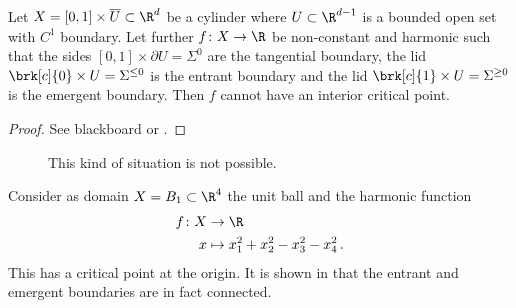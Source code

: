 \begin{frame}
  \begin{proposition}\label{pr:n3_inflowOutflowCylinder}
    Let $X=[0,1]\times \overline{U}\subset\R^d$ be a cylinder where $U\subset\R^{d-1}$ is a bounded open set with $C^1$ boundary.
    Let further $f\colon X\to\R$ be non-constant and
    harmonic such that the sides
    $[0,1]\times \partial U=\Sigma^0$ are the tangential boundary,
    the lid $\brk[c]{0}\times U=\Sigma^{\leq0}$ is the entrant boundary and
    the lid $\brk[c]{1}\times U=\Sigma^{\geq0}$ is the emergent boundary. 
    Then $f$ cannot have an interior critical point.
  \end{proposition}
  \begin{proof}
    See blackboard or \cite{Koppenhoefer2024}.
  \end{proof}
  
\end{frame}

\begin{frame}
  \begin{figure}
    \centering
    
    \caption{This kind of situation is not possible.}
    \label{fi:n3_cylinder}
  \end{figure}
\end{frame}

\begin{frame}
  \begin{example}[Connected entrant boundary in $d=4$ dimensions]\label{ex:n4}
    Consider as domain $X=B_1\subset\R^4$ the unit ball and
    the harmonic function 
    \begin{equation*}
      \begin{aligned}
      f\colon X&\to \R \\
      x &\mapsto x_1^2+x_2^2-x_3^2-x_4^2\,.
      \end{aligned}
      \label{eq:n4_deff}
    \end{equation*}
    This has a critical point at the origin.
    It is shown in \cite{Koppenhoefer2024} that the entrant and emergent boundaries are in fact connected.
  \end{example} 
\end{frame}


